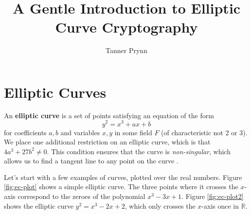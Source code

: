 \documentclass{article}
\begin{document}
\title{A Gentle Introduction to Elliptic Curve Cryptography}
\author{Tanner Prynn}
\maketitle

\tableofcontents
\clearpage

%
%
%
%
%
%
%

\section{Elliptic Curves}
An \textbf{elliptic curve} is a set of points satisfying an equation of the form
$$y^2 = x^3 + ax + b$$
for coefficients $a,b$ and variables $x,y$ in some field $F$ (of characteristic not 2 or 3). 
We place one additional restriction on an elliptic curve, which is that
$4a^3 + 27b^2 \neq 0$.
This condition ensures that the curve is \textit{non-singular}, which allows us to find a tangent line to any point on the curve \cite[$\S$3.1]{ecc-guide}.

Let's start with a few examples of curves, plotted over the real numbers.
Figure \ref{fig:ec-plot} shows a simple elliptic curve.
The three points where it crosses the $x$-axis correspond to the zeroes of the polynomial $x^3 - 3x + 1$.
Figure \ref{fig:ec-plot2} shows the elliptic curve $y^2 = x^3 - 2x + 2$, which only crosses the $x$-axis once in $\mathbb{R}$.
\end{document}
